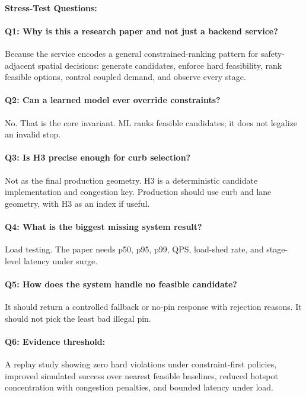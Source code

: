 \documentclass{article}
\begin{document}
\paragraph{Stress-Test Questions:}

\paragraph{Q1: Why is this a research paper and not just a backend service?}
Because the service encodes a general constrained-ranking pattern for safety-adjacent spatial decisions: generate candidates, enforce hard feasibility, rank feasible options, control coupled demand, and observe every stage.

\paragraph{Q2: Can a learned model ever override constraints?}
No. That is the core invariant. ML ranks feasible candidates; it does not legalize an invalid stop.

\paragraph{Q3: Is H3 precise enough for curb selection?}
Not as the final production geometry. H3 is a deterministic candidate implementation and congestion key. Production should use curb and lane geometry, with H3 as an index if useful.

\paragraph{Q4: What is the biggest missing system result?}
Load testing. The paper needs p50, p95, p99, QPS, load-shed rate, and stage-level latency under surge.

\paragraph{Q5: How does the system handle no feasible candidate?}
It should return a controlled fallback or no-pin response with rejection reasons. It should not pick the least bad illegal pin.

\paragraph{Q6: Evidence threshold:}
A replay study showing zero hard violations under constraint-first policies, improved simulated success over nearest feasible baselines, reduced hotspot concentration with congestion penalties, and bounded latency under load.
\end{document}
